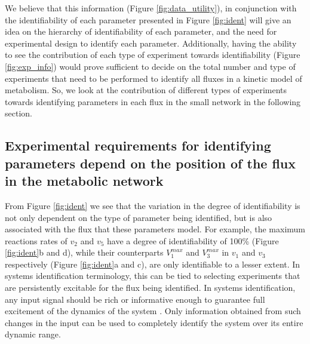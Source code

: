 \documentclass[10pt]{article}
\begin{document}
	We believe that this information (Figure \ref{fig:data_utility}), in conjunction with the identifiability of each parameter presented in Figure \ref{fig:ident} will give an idea on the hierarchy of identifiability of each parameter, and the need for experimental design to identify each parameter. Additionally, having the ability to see the contribution of each type of experiment towards identifiability (Figure \ref{fig:exp_info}) would prove sufficient to decide on the total number and type of experiments that need to be performed to identify all fluxes in a kinetic model of metabolism. So, we look at the contribution of different types of experiments towards identifying parameters in each flux in the small network in the following section.
		
	
	\subsection{Experimental requirements for identifying parameters depend on the position of the flux in the metabolic network}\label{sec:experiment_type}		
	From Figure \ref{fig:ident} we see that the variation in the degree of identifiability is not only dependent on the type of parameter being identified, but is also associated with the flux that these parameters model. For example, the maximum reactions rates of $v_2$ and $v_5$ have a degree of identifiability of 100\% (Figure \ref{fig:ident}b and d), while their counterparts $V_1^{max}$ and $V_3^{max}$ in $v_1$ and $v_3$ respectively (Figure \ref{fig:ident}a and c), are only identifiable to a lesser extent.	
	In systems identification terminology, this can be tied to selecting experiments that are persistently excitable for the flux being identified. In systems identification, any input signal should be rich or informative enough to guarantee full excitement of the dynamics of the system \parencite{Ljung1994}. Only information obtained from such changes in the input can be used to completely identify the system over its entire dynamic range. %
	
\end{document}
